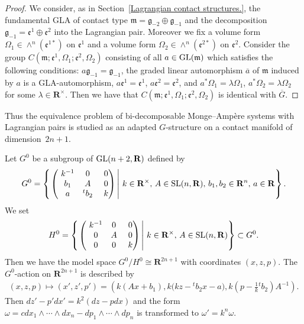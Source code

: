 \begin{proof}
We consider, as in Section~\ref{Lagrangian contact structures.},
the fundamental GLA of contact type
$\mathfrak{m}= \mathfrak{g}_{-2}\oplus \mathfrak{g}_{-1}$ and
the decomposition
$\mathfrak{g}_{-1}=\mathfrak{e}^1\oplus \mathfrak{e}^2$ into the Lagrangian pair.
Moreover we f\/ix a volume form $\Omega_1 \in \wedge^n(\mathfrak{e}^{1*})$ on $\mathfrak{e}^1$ and
a volume form $\Omega_2 \in \wedge^n(\mathfrak{e}^{2*})$ on $\mathfrak{e}^2$.
Consider the group $C(\mathfrak{m}; \mathfrak{e}^1, \Omega_1; \mathfrak{e}^2, \Omega_2)$
consisting of all $a \in  {\rm GL}(\mathfrak{m})$ which satisf\/ies the following conditions:
$a\mathfrak{g}_{-1} = \mathfrak{g}_{-1}$,
the graded linear automorphism $\overline{a}$ of $\mathfrak{m}$ induced by $a$ is a GLA-automorphism,
$a\mathfrak{e}^1 = \mathfrak{e}^1$, $a\mathfrak{e}^2 = \mathfrak{e}^2$, and
$a^*\Omega_1 = \lambda\Omega_1$, $a^*\Omega_2 = \lambda\Omega_2$ for some $\lambda \in {\mathbf{R}}^{\times}$.
Then we have that $C(\mathfrak{m}; \mathfrak{e}^1, \Omega_1; \mathfrak{e}^2, \Omega_2)$ is identical with
$\overline{G}$.
\end{proof}

Thus the equivalence problem of bi-decomposable Monge--Amp{\`e}re systems with Lagrangian pairs
is studied as an adapted $G$-structure on a contact manifold of dimension~$2n+1$.

Let $G^0$ be a subgroup of ${\rm GL}(n+2, {\mathbf{R}})$ def\/ined by
\begin{gather*}
G^0 = \left\{ \left.
\begin{pmatrix}
                      \ k^{-1} & 0 & \ 0 \\
                      \ b_1 & A & \ 0 \\
                      \ a & {}^tb_2 &  \ k
                    \end{pmatrix}
                   \,  \right\vert \,
                    k \in {\mathbf{R}}^{\times}, \, A \in  {\rm SL}(n, {\mathbf{R}}), \, b_1, b_2 \in {\mathbf{R}}^n, \, a \in {\mathbf{R}}
                    \right\}.
\end{gather*}
We set
\begin{gather*}
H^0 = \left\{ \left.
\begin{pmatrix}
                      \ k^{-1} & 0 & \ 0 \\
                      \ 0 & A & \ 0 \\
                      \ 0 & 0 &  \ k
                              \end{pmatrix}
         \,  \right\vert   \,
        k \in {\mathbf{R}}^{\times}, \, A \in  {\rm SL} (n, {\mathbf{R}})
 \right\}
\subset G^0.
\end{gather*}
Then we have the model space
$G^0/H^0 \cong {\mathbf{R}}^{2n+1}$ with coordinates
$(x, z, p)$.
The $G^0$-action on ${\mathbf{R}}^{2n+1}$ is described by
\begin{gather*}
(x, z, p) \mapsto (x', z', p') = \left(k(Ax + b_1), k\big(kz - {}^tb_2x - a\big), k\left(p - \frac{1}{k}{}^tb_2\right)A^{-1}\right).
\end{gather*}
Then $dz' - p'dx' = k^2(dz - pdx)$ and
the form $\omega = c dx_1\wedge \cdots\wedge dx_n - dp_1\wedge\cdots\wedge dp_n$
is transformed to $\omega' = k^n\omega$.

